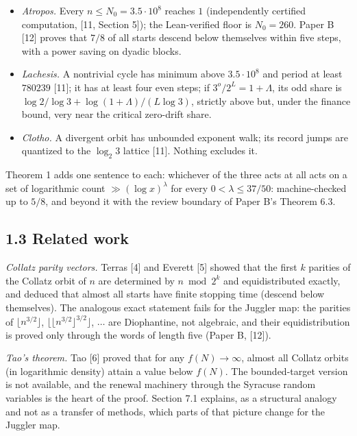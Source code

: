 \documentclass[11pt,a4paper]{article}
\providecommand{\tightlist}{\setlength{\itemsep}{0pt}\setlength{\parskip}{0pt}}
\begin{document}
\begin{itemize}
\tightlist
\item
  \emph{Atropos.} Every \(n\le N_0=3.5\cdot 10^8\) reaches \(1\)
  (independently certified computation, {[}11, Section 5{]}); the
  Lean-verified floor is \(N_0=260\). Paper B {[}12{]} proves that
  \(7/8\) of all starts descend below themselves within five steps, with
  a power saving on dyadic blocks.
\item
  \emph{Lachesis.} A nontrivial cycle has minimum above
  \(3.5\cdot 10^8\) and period at least \(780239\) {[}11{]}; it has at
  least four even steps; if \(3^o/2^L=1+\Lambda\), its odd share is
  \(\log 2/\log 3+\log(1+\Lambda)/(L\log3)\), strictly above but, under
  the finance bound, very near the critical zero-drift share.
\item
  \emph{Clotho.} A divergent orbit has unbounded exponent walk; its
  record jumps are quantized to the \(\log_2 3\) lattice {[}11{]}.
  Nothing excludes it.
\end{itemize}

Theorem 1 adds one sentence to each: whichever of the three acts at all
acts on a set of logarithmic count \(\gg(\log x)^\lambda\) for every
\(0<\lambda\le37/50\): machine-checked up to \(5/8\), and beyond it with
the review boundary of Paper B's Theorem 6.3.

\subsection{1.3 Related work}\label{related-work}

\emph{Collatz parity vectors.} Terras {[}4{]} and Everett {[}5{]} showed
that the first \(k\) parities of the Collatz orbit of \(n\) are
determined by \(n\bmod 2^k\) and equidistributed exactly, and deduced
that almost all starts have finite stopping time (descend below
themselves). The analogous exact statement fails for the Juggler map:
the parities of \(\lfloor n^{3/2}\rfloor\),
\(\lfloor\lfloor n^{3/2}\rfloor^{3/2}\rfloor\), \(\dots\) are
Diophantine, not algebraic, and their equidistribution is proved only
through the words of length five (Paper B, {[}12{]}).

\emph{Tao's theorem.} Tao {[}6{]} proved that for any \(f(N)\to\infty\),
almost all Collatz orbits (in logarithmic density) attain a value below
\(f(N)\). The bounded-target version is not available, and the renewal
machinery through the Syracuse random variables is the heart of the
proof. Section 7.1 explains, as a structural analogy and not as a
transfer of methods, which parts of that picture change for the Juggler
map.
\end{document}
